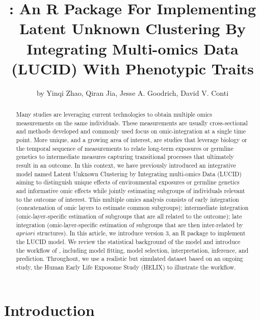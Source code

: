 \title{: An R Package For Implementing Latent Unknown Clustering By Integrating Multi-omics Data (LUCID) With Phenotypic Traits}
\author{by Yinqi Zhao, Qiran Jia, Jesse A. Goodrich, David V. Conti}

\maketitle

\begin{abstract}
Many studies are leveraging current technologies to obtain multiple omics measurements on the same individuals. These measurements are usually cross-sectional and methods developed and commonly used focus on omic-integration at a single time point. More unique, and a growing area of interest, are studies that leverage biology or the temporal sequence of measurements to relate long-term exposures or germline genetics to intermediate measures capturing transitional processes that ultimately result in an outcome. In this context, we have previously introduced an integrative model named Latent Unknown Clustering by Integrating multi-omics Data (LUCID) aiming to distinguish unique effects of environmental exposures or germline genetics and informative omic effects while jointly estimating subgroups of individuals relevant to the outcome of interest. This multiple omics analysis consists of early integration (concatenation of omic layers to estimate common subgroups); intermediate integration (omic-layer-specific estimation of subgroups that are all related to the outcome); late integration (omic-layer-specific estimation of subgroups that are then inter-related by $a priori$ structures). In this article, we introduce  version 3, an R package to implement the LUCID model. We review the statistical background of the model and introduce the workflow of , including model fitting, model selection, interpretation, inference, and prediction. Throughout, we use a realistic but simulated dataset based on an ongoing study, the Human Early Life Exposome Study (HELIX) to illustrate the workflow.
\end{abstract}

\section{Introduction} \label{sec1}

